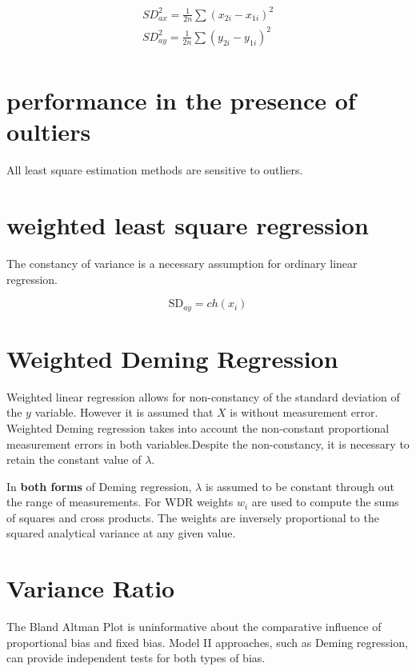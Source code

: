 \documentclass[12pt, a4paper]{report}
\theoremstyle{plain}
\theoremstyle{definition}
\theoremstyle{remark}
\begin{document}
\begin{eqnarray*}
	SD^{2}_{ax} = \frac{1}{2n} \sum (x_{2i} - x_{1i})^{2}\\
	SD^{2}_{ay} = \frac{1}{2n} \sum (y_{2i} - y_{1i})^{2}\\
\end{eqnarray*}

\section{performance in the presence of oultiers}
All least square estimation methods are sensitive to outliers.

\section{weighted least square regression}
The constancy of variance is a necessary assumption for ordinary
linear regression.

\begin{equation}
	\mbox{SD}_{ay}  = ch(x_{i})
\end{equation}
\section{Weighted Deming Regression}

Weighted linear regression allows for non-constancy of the standard deviation of the $y$ variable. However it is assumed that $X$ is without measurement error. Weighted Deming regression takes into account the non-constant proportional measurement errors in both variables.Despite the non-constancy, it is necessary to retain the constant value of $\lambda$.

In \textbf{both forms} of Deming regression, $\lambda$ is assumed to be constant through out the range of measurements. For WDR weights $w_{i}$ are used to compute the sums of squares and cross products. The weights are inversely proportional to the squared analytical variance at any given value.

\section{Variance Ratio}
The Bland Altman Plot is uninformative about the comparative influence of proportional bias and fixed bias. Model II approaches, such as Deming regression,  can provide independent tests for
both types of bias.
\end{document}
